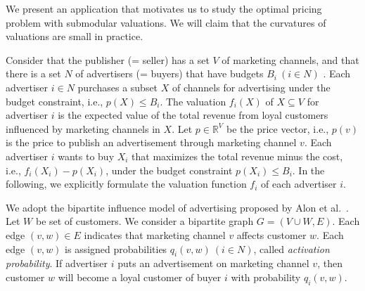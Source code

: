 \documentclass[letterpaper]{article}
\theoremstyle{definition}
\begin{document}
We present an application that motivates us to study the optimal pricing problem with submodular valuations.
We will claim that the curvatures of valuations are small in practice.



Consider that the publisher (= seller) has a set $V$ of marketing channels, and that there is a set $N$ of advertisers (= buyers) that have budgets $B_i \ (i \in N)$ .
Each advertiser $i \in N$ purchases a subset $X$ of channels for advertising under the budget constraint, i.e., $p(X) \leq B_i$.
The valuation $f_i(X)$ of $X \subseteq V$ for advertiser $i$ is the expected value of the total revenue from loyal customers influenced by marketing channels in $X$.
Let $p \in \mathbb{R}^V$ be the price vector, i.e., $p(v)$ is the price to publish an advertisement through marketing channel $v$.
Each advertiser $i$ wants to buy $X_i$ that maximizes the total revenue minus the cost, i.e., $f_i(X_i) - p(X_i)$, under the budget constraint $p(X_i) \leq B_i$.
In the following, we explicitly formulate the valuation function $f_i$ of each advertiser $i$.

We adopt the bipartite influence model of advertising proposed by Alon et al.~\cite{alon2012optimizing}.
Let $W$ be set of customers.
We consider a bipartite graph $G = (V \cup W, E)$. Each edge $(v, w) \in E$ indicates that marketing channel $v$ affects customer $w$.
Each edge $(v,w)$ is assigned probabilities $q_i(v,w) \ (i \in N)$, called \emph{activation probability}.
If advertiser $i$ puts an advertisement on marketing channel $v$, then customer $w$ will become a loyal customer of buyer $i$ with probability $q_i(v,w)$.
\end{document}
